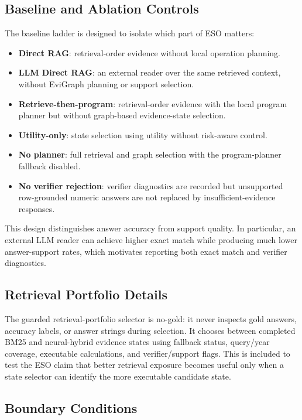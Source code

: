\subsection{Baseline and Ablation Controls}

The baseline ladder is designed to isolate which part of ESO matters:
\begin{itemize}
    \item \textbf{Direct RAG}: retrieval-order evidence without local operation
    planning.
    \item \textbf{LLM Direct RAG}: an external reader over the same retrieved
    context, without EviGraph planning or support selection.
    \item \textbf{Retrieve-then-program}: retrieval-order evidence with the
    local program planner but without graph-based evidence-state selection.
    \item \textbf{Utility-only}: state selection using utility without
    risk-aware control.
    \item \textbf{No planner}: full retrieval and graph selection with the
    program-planner fallback disabled.
    \item \textbf{No verifier rejection}: verifier diagnostics are recorded but
    unsupported row-grounded numeric answers are not replaced by
    insufficient-evidence responses.
\end{itemize}
This design distinguishes answer accuracy from support quality.  In particular,
an external LLM reader can achieve higher exact match while producing much lower
answer-support rates, which motivates reporting both exact match and verifier
diagnostics.

\subsection{Retrieval Portfolio Details}

The guarded retrieval-portfolio selector is no-gold: it never inspects gold
answers, accuracy labels, or answer strings during selection.  It chooses
between completed BM25 and neural-hybrid evidence states using fallback status,
query/year coverage, executable calculations, and verifier/support flags.  This
is included to test the ESO claim that better retrieval exposure becomes useful
only when a state selector can identify the more executable candidate state.

\subsection{Boundary Conditions}


